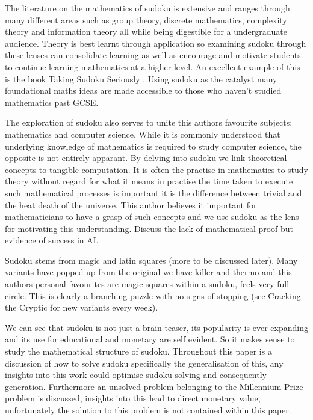 \documentclass[a4paper,11pt]{report}
\begin{document}
The literature on the mathematics of sudoku is extensive and ranges through many different areas such as group theory, discrete mathematics, complexity theory and information theory all while being digestible for a undergraduate audience. Theory is best learnt through application so examining sudoku through these lenses can consolidate learning as well as encourage and motivate students to continue learning mathematics at a higher level. An excellent example of this is the book Taking Sudoku Seriously \cite{takingsudokuseriously}. Using sudoku as the catalyst many foundational maths ideas are made accessible to those who haven't studied mathematics past GCSE.

The exploration of sudoku also serves to unite this authors favourite subjects: mathematics and computer science. While it is commonly understood that underlying knowledge of mathematics is required to study computer science, the opposite is not entirely apparant. By delving into sudoku we link theoretical concepts to tangible computation. It is often the practise in mathematics to study theory without regard for what it means in practise the time taken to execute such mathematical processes is important it is the difference between trivial and the heat death of the universe. This author believes it important for mathematicians to have a grasp of such concepts and we use sudoku as the lens for motivating this understanding. Discuss the lack of mathematical proof but evidence of success in AI.

Sudoku stems from magic and latin squares (more to be discussed later). Many variants have popped up from the original we have killer and thermo and this authors personal favourites are magic squares within a sudoku, feels very full circle. This is clearly a branching puzzle with no signs of stopping (see Cracking the Cryptic for new variants every week).

We can see that sudoku is not just a brain teaser, its popularity is ever expanding and its use for educational and monetary are self evident. So it makes sense to study the mathematical structure of sudoku.  Throughout this paper is a discussion of how to solve sudoku specifically the generalisation of this, any insights into this work could optimise sudoku solving and consequently generation. Furthermore an unsolved problem belonging to the Millennium Prize problem is discussed, insights into this lead to direct monetary value, unfortunately the solution to this problem is not contained within this paper.
\end{document}
